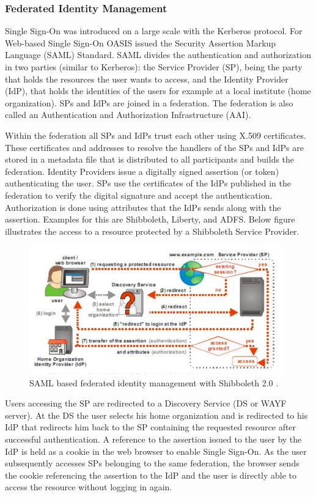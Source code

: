 \documentclass[12pt]{report}
\begin{document}
	\subsubsection{Federated Identity Management}
		Single Sign-On was introduced on a large scale with the Kerberos protocol. For Web-based Single Sign-On OASIS issued the Security Assertion Markup Language (SAML) Standard. SAML divides the authentication and authorization in two parties (similar to Kerberos): the Service Provider (SP), being the party that holds the resources the user wants to access, and the Identity Provider (IdP), that holds the identities of the users for example at a local institute (home organization). SPs and IdPs are joined in a federation. The federation is also called an Authentication and Authorization Infrastructure (AAI). \newline
		
		Within the federation all SPs and IdPs trust each other using X.509 certificates. These certificates and addresses to resolve the handlers of the SPs and IdPs are stored in a metadata file that is distributed to all participants and builds the federation. Identity Providers issue a digitally signed assertion (or token) authenticating the user. SPs use the certificates of the IdPs published in the federation to verify the digital signature and accept the authentication. Authorization is done using attributes that the IdPs sends along with the assertion. Examples for this are Shibboleth, Liberty, and ADFS. Below figure illustrates the access to a resource protected by a Shibboleth Service Provider.
	\begin{figure}[H]
	\begin{center}
	\includegraphics[width=11cm]{./3-1.png}
	\caption{ SAML based federated identity management with Shibboleth 2.0 . \label{fig:SAML based federated identity management with Shibboleth2.0. }}
	\end{center}
	\end{figure}
	Users accessing the SP are redirected to a Discovery Service (DS or WAYF server). At the DS the user selects his home organization and is redirected to his IdP that redirects him back to the SP containing the requested resource after successful authentication. A reference to the assertion issued to the user by the IdP is held as a cookie in the web browser to enable Single Sign-On. As the user subsequently accesses SPs belonging to the same federation, the browser sends the cookie referencing the assertion to the IdP and the user is directly able to access the resource without logging in again.\newline
	
\end{document}
